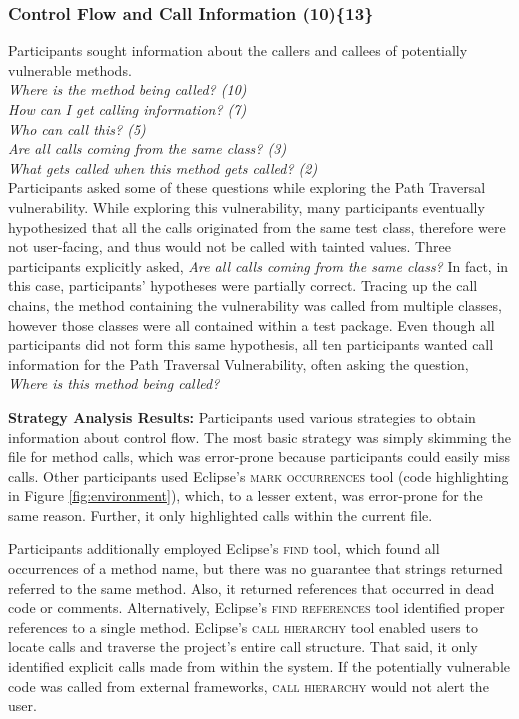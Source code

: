 \documentclass[10pt,journal,compsoc]{IEEEtran}
\begin{document}
\subsubsection{Control Flow and Call Information (10)\{13\}}\label{cf}

Participants sought information about the callers and callees of potentially vulnerable methods.
\\

\noindent\emph{Where is the method being called? (10)} \\
\emph{How can I get calling information? (7)} \\
\emph{Who can call this? (5)} \\
\emph{Are all calls coming from the same class? (3)} \\
\emph{What gets called when this method gets called? (2)}
\\

Participants asked some of these questions while exploring the Path Traversal vulnerability.
While exploring this vulnerability, many participants eventually hypothesized that all the calls originated from the same test class, therefore were not user-facing, and thus would not be called with tainted values.
Three participants explicitly asked, \textit{Are all calls coming from the same class?} 
In fact, in this case, participants' hypotheses were partially correct. 
Tracing up the call chains, the method containing the vulnerability was called from multiple classes, however those classes were all contained within a test package.
Even though all participants did not form this same hypothesis, all ten participants wanted call information for the Path Traversal Vulnerability, often asking the question, \textit{Where is this method being called?} 

 
\textbf{Strategy Analysis Results:}
Participants used various strategies to obtain information about control flow.
The most basic strategy was simply skimming the file for method calls, which was error-prone because participants could easily miss calls.
Other participants used Eclipse's \textsc{mark occurrences} tool (code highlighting in Figure \ref{fig:environment}), which, to a lesser extent, was error-prone for the same reason. 
Further, it only highlighted calls within the current file.

Participants additionally employed Eclipse's \textsc{find} tool, which found all occurrences of a method name, but there was no guarantee that strings returned referred to the same method.
Also, it returned references that occurred in dead code or comments.
Alternatively, Eclipse's \textsc{find references} tool identified proper references to a single method.
Eclipse's \textsc{call hierarchy} tool enabled users to locate calls and traverse the project's entire call structure.
That said, it only identified explicit calls made from within the system. 
If the potentially vulnerable code was called from external frameworks, \textsc{call hierarchy} would not alert the user.
\end{document}
